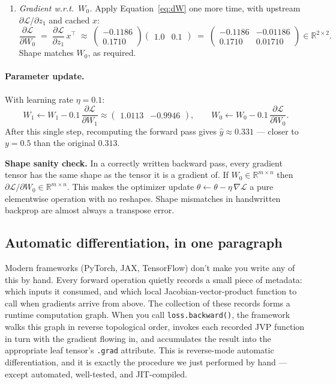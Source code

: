 \documentclass[11pt, a4paper]{article}
\newcommand{\R}{\mathbb{R}}
\newcommand{\T}{^{\!\top}}
\newcommand{\Loss}{\mathcal{L}}
\begin{document}
\begin{enumerate}[leftmargin=*, label=(\arabic*)]
    \item \emph{Gradient w.r.t.\ $W_0$.} Apply Equation~\eqref{eq:dW} one more time, with upstream $\partial \Loss / \partial z_1$ and cached $x$:
    \[
        \frac{\partial \Loss}{\partial W_0} \;=\; \frac{\partial \Loss}{\partial z_1}\, x\T
        \;\approx\; \begin{pmatrix} -0.1186 \\ 0.1710 \end{pmatrix} \begin{pmatrix} 1.0 & 0.1 \end{pmatrix}
        \;=\; \begin{pmatrix} -0.1186 & -0.01186 \\ 0.1710 & 0.01710 \end{pmatrix} \in \R^{2 \times 2}.
    \]
    Shape matches $W_0$, as required.
\end{enumerate}

\paragraph{Parameter update.} With learning rate $\eta = 0.1$:
\[
    W_1 \leftarrow W_1 - 0.1\, \frac{\partial \Loss}{\partial W_1} \approx \begin{pmatrix} 1.0113 & -0.9946 \end{pmatrix}, \qquad
    W_0 \leftarrow W_0 - 0.1\, \frac{\partial \Loss}{\partial W_0}.
\]
After this single step, recomputing the forward pass gives $\hat y \approx 0.331$ --- closer to $y = 0.5$ than the original $0.313$.

\begin{keybox}
\textbf{Shape sanity check.} In a correctly written backward pass, every gradient tensor has the same shape as the tensor it is a gradient of. If $W_0 \in \R^{m \times n}$ then $\partial \Loss / \partial W_0 \in \R^{m \times n}$. This makes the optimizer update $\theta \leftarrow \theta - \eta\,\nabla\Loss$ a pure elementwise operation with no reshapes. Shape mismatches in handwritten backprop are almost always a transpose error.
\end{keybox}

\subsection{Automatic differentiation, in one paragraph}

Modern frameworks (PyTorch, JAX, TensorFlow) don't make you write any of this by hand. Every forward operation quietly records a small piece of metadata: which inputs it consumed, and which local Jacobian-vector-product function to call when gradients arrive from above. The collection of these records forms a runtime computation graph. When you call \verb|loss.backward()|, the framework walks this graph in reverse topological order, invokes each recorded JVP function in turn with the gradient flowing in, and accumulates the result into the appropriate leaf tensor's \verb|.grad| attribute. This is reverse-mode automatic differentiation, and it is exactly the procedure we just performed by hand --- except automated, well-tested, and JIT-compiled.
\end{document}

